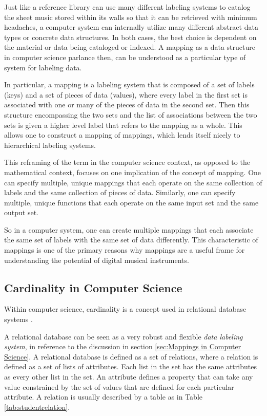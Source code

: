 Just like a reference library can use many different labeling systems to catalog the sheet music stored within its walls so that it can be retrieved with minimum headaches, a computer system can internally utilize many different abstract data types or concrete data structures. In both cases, the best choice is dependent on the material or data being cataloged or indexed. A mapping as a data structure in computer science parlance then, can be understood as a particular type of system for labeling data.

In particular, a mapping is a labeling system that is composed of a set of labels (keys) and a set of pieces of data (values), where every label in the first set is associated with one or many of the pieces of data in the second set. Then this structure encompassing the two sets and the list of associations between the two sets is given a higher level label that refers to the mapping as a whole. This allows one to construct a mapping of mappings, which lends itself nicely to hierarchical labeling systems.

This reframing of the term in the computer science context, as opposed to the mathematical context, focuses on one implication of the concept of mapping. One can specify multiple, unique mappings that each operate on the same collection of labels and the same collection of pieces of data. Similarly, one can specify multiple, unique functions that each operate on the same input set and the same output set. 

So in a computer system, one can create multiple mappings that each associate the same set of labels with the same set of data differently. This characteristic of mappings is one of the primary reasons why mappings are a useful frame for understanding the potential of digital musical instruments. 

\subsection{Cardinality in Computer Science}

Within computer science, cardinality is a concept used in relational database systems \cite{carddata1987}. 

A relational database can be seen as a very robust and flexible \emph{data labeling system}, in reference to the discussion in section \ref{sec:Mappings in Computer Science}. A relational database is defined as a set of relations, where a relation is defined as a set of lists of attributes. Each list in the set has the same attributes as every other list in the set. An attribute defines a property that can take any value constrained by the set of values that are defined for each particular attribute. A relation is usually described by a table as in Table \ref{tab:studentrelation}.

